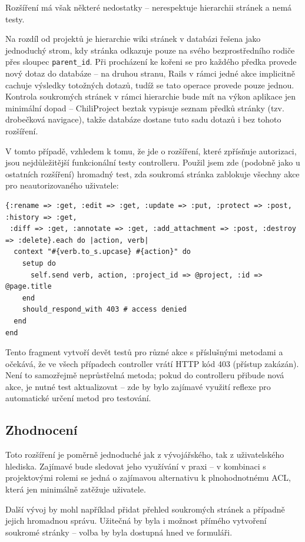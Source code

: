 \documentclass[thesis=B,czech]{FITthesis}[2012/05/02]
\begin{document}
Rozšíření má však některé nedostatky -- nerespektuje hierarchii stránek
a nemá testy.

Na rozdíl od projektů je hierarchie wiki stránek v databázi řešena jako
jednoduchý strom, kdy stránka odkazuje pouze na svého bezprostředního
rodiče přes sloupec \lstinline!parent_id!. Při procházení ke kořeni se
pro každého předka provede nový dotaz do databáze -- na druhou stranu,
Rails v rámci jedné akce implicitně cachuje výsledky totožných dotazů,
tudíž se tato operace provede pouze jednou. Kontrola soukromých stránek
v rámci hierarchie bude mít na výkon aplikace jen minimální dopad --
ChiliProject beztak vypisuje seznam předků stránky (tzv. drobečková
navigace), takže databáze dostane tuto sadu dotazů i bez tohoto
rozšíření.

V tomto případě, vzhledem k tomu, že jde o rozšíření, které zpřísňuje
autorizaci, jsou nejdůležitější funkcionální testy controlleru. Použil
jsem zde (podobně jako u ostatních rozšíření) hromadný test, zda soukromá
stránka zablokuje všechny akce pro neautorizovaného uživatele:

\begin{lstlisting}
{:rename => :get, :edit => :get, :update => :put, :protect => :post, :history => :get,
 :diff => :get, :annotate => :get, :add_attachment => :post, :destroy => :delete}.each do |action, verb|
  context "#{verb.to_s.upcase} #{action}" do
    setup do
      self.send verb, action, :project_id => @project, :id => @page.title
    end
    should_respond_with 403 # access denied
  end
end
\end{lstlisting}
Tento fragment vytvoří devět testů pro různé akce s příslušnými metodami
a očekává, že ve všech případech controller vrátí HTTP kód 403
(přístup zakázán). Není to samozřejmě neprůstřelná metoda; pokud do
controlleru přibude nová akce, je nutné test aktualizovat -- zde by bylo
zajímavé využití reflexe pro automatické určení metod pro testování.

\subsection{Zhodnocení}

Toto rozšíření je poměrně jednoduché jak z vývojářského, tak
z uživatelského hlediska. Zajímavé bude sledovat jeho využívání
v praxi -- v kombinaci s projektovými rolemi se jedná
o zajímavou alternativu k plnohodnotnému \gls{ACL}, která jen minimálně
zatěžuje uživatele.

Další vývoj by mohl například přidat přehled soukromých stránek a
případně jejich hromadnou správu. Užitečná by byla i možnost přímého vytvoření
soukromé stránky -- volba by byla dostupná hned ve formuláři.
\end{document}

